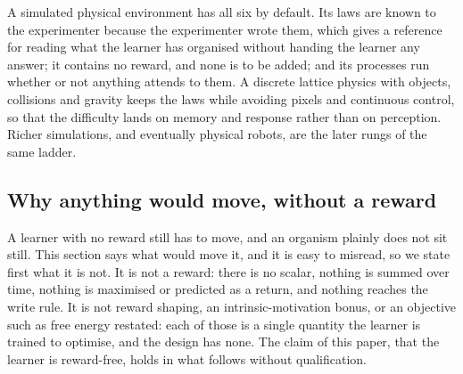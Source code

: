 \documentclass[11pt,a4paper]{article}
\theoremstyle{plain}
\theoremstyle{definition}
\theoremstyle{remark}
\begin{document}
A simulated physical environment has all six by default. Its laws are known to
the experimenter because the experimenter wrote them, which gives a reference
for reading what the learner has organised without handing the learner any
answer; it contains no reward, and none is to be added; and its processes run
whether or not anything attends to them. A discrete lattice physics with
objects, collisions and gravity keeps the laws while avoiding pixels and
continuous control, so that the difficulty lands on memory and response rather
than on perception. Richer simulations, and eventually physical robots, are the
later rungs of the same ladder.

\subsection{Why anything would move, without a reward}

A learner with no reward still has to move, and an organism plainly does not sit
still. This section says what would move it, and it is easy to misread, so we
state first what it is not. It is not a reward: there is no scalar, nothing is
summed over time, nothing is maximised or predicted as a return, and nothing
reaches the write rule. It is not reward shaping, an intrinsic-motivation bonus,
or an objective such as free energy restated: each of those is a single quantity
the learner is trained to optimise, and the design has none. The claim of this
paper, that the learner is reward-free, holds in what follows without
qualification.
\end{document}
